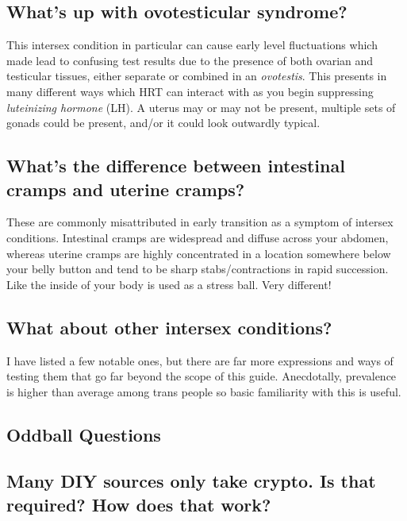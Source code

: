 \documentclass{article}
\begin{document}
\subsection{What's up with ovotesticular syndrome?}

This intersex condition in particular can cause early level fluctuations which made lead to confusing test results due to the presence of both ovarian and testicular tissues, either separate or combined in an \textit{ovotestis}. This presents in many different ways which HRT can interact with as you begin suppressing \textit{luteinizing hormone} (LH). A uterus may or may not be present, multiple sets of gonads could be present, and/or it could look outwardly typical.

\subsection{What’s the difference between intestinal cramps and uterine cramps?}\label{11-35}

These are commonly misattributed in early transition as a symptom of intersex conditions. Intestinal cramps are widespread and diffuse across your abdomen, whereas uterine cramps are highly concentrated in a location somewhere below your belly button and tend to be sharp stabs/contractions in rapid succession. Like the inside of your body is used as a stress ball. Very different!

\subsection{What about other intersex conditions?}

I have listed a few notable ones, but there are far more expressions and ways of testing them that go far beyond the scope of this guide. Anecdotally, prevalence is higher than average among trans people so basic familiarity with this is useful.

\subsection*{Oddball Questions}

\subsection{Many DIY sources only take crypto. Is that required? How does that work?}
\end{document}
